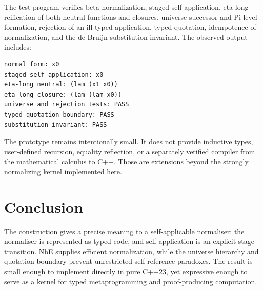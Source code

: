 \documentclass[11pt,a4paper]{article}
\begin{document}
The test program verifies beta normalization, staged self-application, eta-long reification of both neutral functions and closures, universe successor and Pi-level formation, rejection of an ill-typed application, typed quotation, idempotence of normalization, and the de Bruijn substitution invariant. The observed output includes:
\begin{lstlisting}
normal form: x0
staged self-application: x0
eta-long neutral: (lam (x1 x0))
eta-long closure: (lam (lam x0))
universe and rejection tests: PASS
typed quotation boundary: PASS
substitution invariant: PASS
\end{lstlisting}

The prototype remains intentionally small. It does not provide inductive types, user-defined recursion, equality reflection, or a separately verified compiler from the mathematical calculus to C++. Those are extensions beyond the strongly normalizing kernel implemented here.

\section{Conclusion}
The construction gives a precise meaning to a self-applicable normaliser: the normaliser is represented as typed code, and self-application is an explicit stage transition. NbE supplies efficient normalization, while the universe hierarchy and quotation boundary prevent unrestricted self-reference paradoxes. The result is small enough to implement directly in pure C++23, yet expressive enough to serve as a kernel for typed metaprogramming and proof-producing computation.
\end{document}
